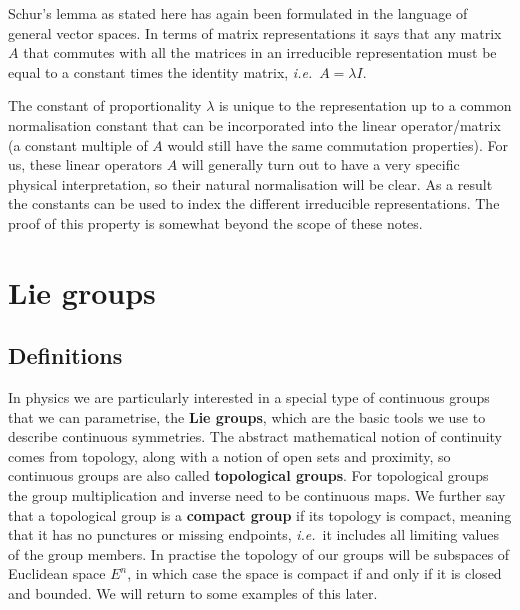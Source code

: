 \documentclass[notes.tex]{subfiles}
\begin{document}
Schur's lemma as stated here has again been formulated in the language of general vector spaces. In terms of matrix representations it says that any matrix $A$ that commutes with all the matrices in an irreducible representation must be equal to a constant times the identity matrix, {\it i.e.}\ $A=\lambda I$.

The constant of proportionality $\lambda$ is unique to the representation up to a common normalisation constant that can be incorporated into the linear operator/matrix (a constant multiple of $A$ would still have the same commutation properties). For us, these linear operators $A$ will generally turn out to have a very specific physical interpretation, so their natural normalisation will be clear. As a result the constants can be used to index the different irreducible representations. The proof of this property is somewhat beyond the scope of these notes.



\section{Lie groups}
\label{sec:Lie_groups}


\subsection{Definitions}
\label{sec:Lie_group_definitions}
In physics we are particularly interested in a special type of continuous groups that we can parametrise, the {\bf Lie groups}, which are the basic tools we use to describe continuous symmetries. The abstract mathematical notion of continuity comes from topology, along with a notion of open sets and proximity, so continuous groups are also called {\bf topological groups}. For topological groups the group multiplication and inverse need to be continuous maps. We further say that a topological group is a {\bf compact group} if its topology is compact, meaning that it has no punctures or missing endpoints, {\it i.e.}\ it includes all limiting values of the group members. In practise the topology of our groups will be subspaces of Euclidean space $E^n$, in which case the space is compact if and only if it is closed and bounded. We will return to some examples of this later.
\end{document}
